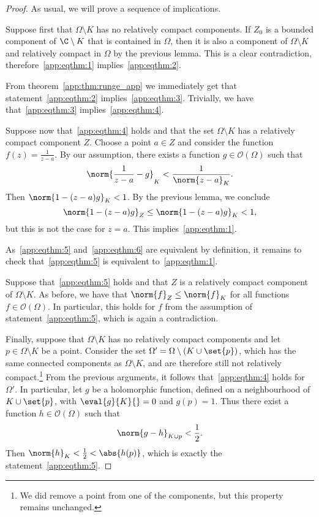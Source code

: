 \begin{proof}
As usual, we will prove a sequence of implications.

Suppose first that $\Omega \setminus K$ has no relatively compact
components. If $Z_0$ is a bounded component of $\C \setminus K$
that is contained in $\Omega$, then it is also a component of
$\Omega \setminus K$ and relatively compact in $\Omega$ by the
previous lemma. This is a clear contradiction,
therefore~\ref{app:eqthm:1} implies~\ref{app:eqthm:2}.
    
From theorem~\ref{app:thm:runge_app} we immediately get that
statement~\ref{app:eqthm:2} implies~\ref{app:eqthm:3}. Trivially,
we have that~\ref{app:eqthm:3} implies~\ref{app:eqthm:4}.

Suppose now that~\ref{app:eqthm:4} holds and that the set
$\Omega \setminus K$ has a relatively compact component $Z$. Choose
a point $a \in Z$ and consider the function
$f(z) = \frac{1}{z - a}$. By our assumption, there exists a
function $g \in \mathcal{O}(\Omega)$ such that
\[
\norm{\frac{1}{z - a} - g}_K < \frac{1}{\norm{z-a}_K}.
\]
Then $\norm{1 - (z - a)g}_K < 1$. By the previous lemma, we
conclude
\[
\norm{1 - (z - a)g}_Z \leq \norm{1 - (z - a)g}_K < 1,
\]
but this is not the case for $z = a$. This
implies~\ref{app:eqthm:1}.

As~\ref{app:eqthm:5} and~\ref{app:eqthm:6} are equivalent by
definition, it remains to check that~\ref{app:eqthm:5} is
equivalent to~\ref{app:eqthm:1}.

Suppose that~\ref{app:eqthm:5} holds and that $Z$ is a relatively
compact component of $\Omega \setminus K$. As before, we have that
$\norm{f}_Z \leq \norm{f}_K$ for all functions
$f \in \mathcal{O}(\Omega)$. In particular, this holds for $f$ from
the assumption of statement~\ref{app:eqthm:5}, which is again a
contradiction.

Finally, suppose that $\Omega \setminus K$ has no relatively
compact components and let $p \in \Omega \setminus K$ be a point.
Consider the set $\Omega' = \Omega \setminus (K \cup \set{p})$,
which has the same connected components as $\Omega \setminus K$,
and are therefore still not relatively compact.\footnote{We did
remove a point from one of the components, but this property
remains unchanged.} From the previous arguments, it follows
that~\ref{app:eqthm:4} holds for $\Omega'$. In particular, let $g$
be a holomorphic function, defined on a neighbourhood of
$K \cup \set{p}$, with $\eval{g}{K}{} = 0$ and $g(p) = 1$. Thus
there exist a function $h \in \mathcal{O}(\Omega)$ such that
\[
\norm{g - h}_{K \cup p} < \frac{1}{2}.
\]
Then $\norm{h}_K < \frac{1}{2} < \abs{h(p)}$, which is exactly the
statement~\ref{app:eqthm:5}.
\end{proof}

